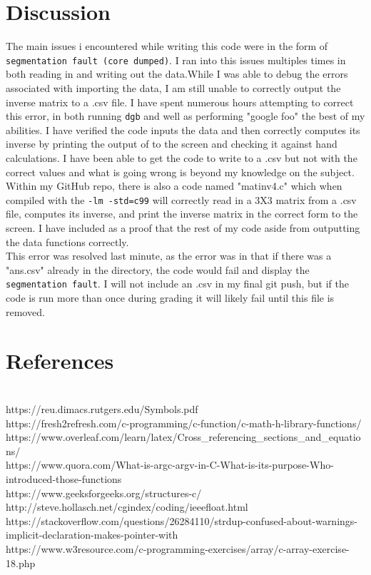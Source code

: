 \documentclass[11pt]{report}
\newcommand{\code}[1]{\colorbox{light-gray}{\texttt{#1}}}
\begin{document}
\section{Discussion}
The main issues i encountered while writing this code were in the form of \code{segmentation fault (core dumped)}. I ran into this issues multiples times in both reading in and writing out the data.While I was able to debug the errors associated with importing the data, I am still unable to correctly output the inverse matrix to a .csv file. I have spent numerous hours attempting to correct this error, in both running \code{dgb} and well as performing "google foo" the best of my abilities. I have verified the code inputs the data and then correctly computes its inverse by printing the output of to the screen and checking it against hand calculations. I have been able to get the code to write to a .csv but not with the correct values and what is going wrong is beyond my knowledge on the subject. Within my GitHub repo, there is also a code named "matinv4.c" which when compiled with the \code{-lm -std=c99} will correctly read in a 3X3 matrix from a .csv file, computes its inverse, and print the inverse matrix in the correct form to the screen. I have included as a proof that the rest of my code aside from outputting the data functions correctly. \\ This error was resolved last minute, as the error was in that if there was a "ans.csv" already in the directory, the code would fail and display the \code{segmentation fault}. I will not include an .csv in my final git push, but if the code is run more than once during grading it will likely fail until this file is removed. 
\newpage
\section{References}
\\ https://reu.dimacs.rutgers.edu/Symbols.pdf
\\ https://fresh2refresh.com/c-programming/c-function/c-math-h-library-functions/
\\ https://www.overleaf.com/learn/latex/Cross\_referencing\_sections\_and\_equations/
\\ https://www.quora.com/What-is-argc-argv-in-C-What-is-its-purpose-Who-introduced-those-functions
\\ https://www.geeksforgeeks.org/structures-c/
\\ http://steve.hollasch.net/cgindex/coding/ieeefloat.html
\\ https://stackoverflow.com/questions/26284110/strdup-confused-about-warnings-implicit-declaration-makes-pointer-with
\\https://www.w3resource.com/c-programming-exercises/array/c-array-exercise-18.php
\end{document}
